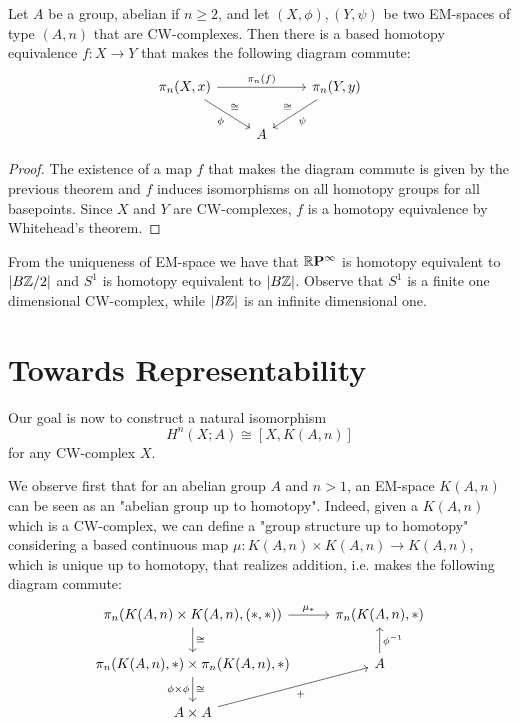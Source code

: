 \begin{corollary}
Let $A$ be a group, abelian if $n\ge2$, and let $(X,\phi), (Y,\psi)$ be two EM-spaces of type $(A,n)$ that are CW-complexes. Then there is a based homotopy equivalence $f:X\to Y$ that makes the following diagram commute:
\[
\begin{tikzcd}
\pi_n(X,x) \ar[dr,"\phi"',"\cong"] \ar[rr,"\pi_n(f)"] & & \pi_n(Y,y) \ar[dl,"\psi","\cong"']\\
& A &
\end{tikzcd}
\]
\end{corollary}

\begin{proof}
The existence of a map $f$ that makes the diagram commute is given by the previous theorem and $f$ induces isomorphisms on all homotopy groups for all basepoints. Since $X$ and $Y$ are CW-complexes, $f$ is a homotopy equivalence by Whitehead's theorem.
\end{proof}

\begin{example}
From the uniqueness of EM-space we have that ${{\mathbb R}\mathbf{P}^{\infty}}$ is homotopy equivalent to $|B{\mathbb Z}/2|$ and $S^1$ is homotopy equivalent to $|B{\mathbb Z}|$. Observe that $S^1$ is a finite one dimensional CW-complex, while $|B{\mathbb Z}|$ is an infinite dimensional one.
\end{example}

\section{Towards Representability}

Our goal is now to construct a natural isomorphism
\[H^n(X;A)\cong[X,K(A,n)]\]
for any CW-complex $X$.

We observe first that for an abelian group $A$ and $n>1$, an EM-space $K(A,n)$ can be seen as an "abelian group up to homotopy". Indeed, given a $K(A,n)$ which is a CW-complex, we can define a "group structure up to homotopy" considering a based continuous map $\mu:K(A,n)\times K(A,n)\to K(A,n)$, which is unique up to homotopy, that realizes addition, i.e. makes the following diagram commute:
\[
\begin{tikzcd}
\pi_n(K(A,n)\times K(A,n),(*,*)) \ar[d,"\cong"] \ar[r,"\mu_*"] & \pi_n(K(A,n),*)\\
\pi_n(K(A,n),*)\times \pi_n(K(A,n),*) \ar[d,"\phi\times\phi"',"\cong"] & A \ar[u,"\phi^\inv"']\\
A\times A \ar[ur,"+"'] &
\end{tikzcd}
\]

